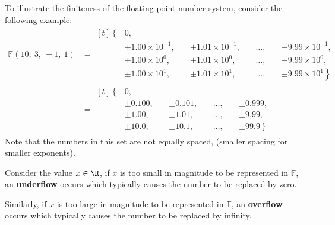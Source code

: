 \documentclass{article}
\begin{document}
To illustrate the finiteness of the floating point number system, consider
the following example:
\begin{align*}
    \mathbb{F}\left( 10,\: 3,\: -1,\: 1\right) & = \begin{aligned}[t]
                                                       \left\{\right. & 0,                                                                                                                \\
                                                                      & \pm 1.00 \times 10^{-1},\: &  & \pm 1.01 \times 10^{-1},\: &  & \dots,\: &  & \pm 9.99 \times 10^{-1},            \\
                                                                      & \pm 1.00 \times 10^0,\:    &  & \pm 1.01 \times 10^0,\:    &  & \dots,\: &  & \pm 9.99 \times 10^0,               \\
                                                                      & \pm 1.00 \times 10^1,\:    &  & \pm 1.01 \times 10^1,\:    &  & \dots,\: &  & \pm 9.99 \times 10^1 \left.\right\}
                                                   \end{aligned} \\
                                               & = \begin{aligned}[t]
                                                       \left\{\right. & 0,                                                                        \\
                                                                      & \pm 0.100,\: &  & \pm 0.101,\: &  & \dots,\: &  & \pm 0.999,              \\
                                                                      & \pm 1.00,\:  &  & \pm 1.01,\:  &  & \dots,\: &  & \pm 9.99,               \\
                                                                      & \pm 10.0,\:  &  & \pm 10.1,\:  &  & \dots,\: &  & \pm 99.9 \left.\right\}
                                                   \end{aligned}
\end{align*}
Note that the numbers in this set are not equally spaced, (smaller spacing for smaller exponents).
\begin{definition}
    Consider the value \(x \in \R\), if \(x\) is too small in magnitude to be
    represented in \(\mathbb{F}\),
    an \textbf{underflow} occurs which typically causes the number to be replaced by zero.

    Similarly, if \(x\) is too large in magnitude to be represented in \(\mathbb{F}\),
    an \textbf{overflow} occurs which typically causes the number to be replaced by infinity.
\end{definition}
\end{document}
